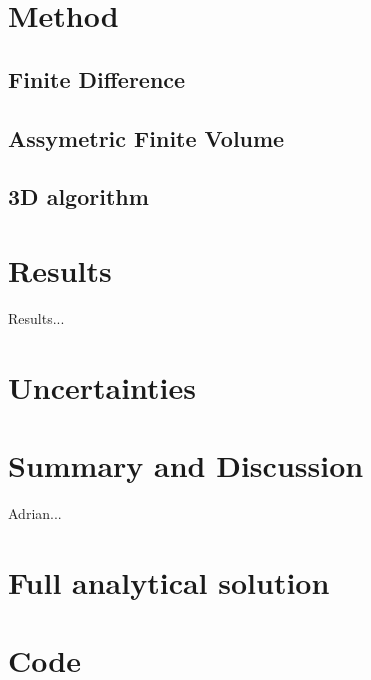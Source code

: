 \documentclass[aps,twocolumn,pre,nofootinbib]{revtex4-1}
\begin{document}
\section{Method \label{sec:met}}

 
\subsection{Finite Difference }


\subsection{Assymetric Finite Volume }


\subsection{3D algorithm}






\section{Results \label{sec:res}}


Results...


\section{Uncertainties \label{sec:unc}}




\section{Summary and Discussion \label{sec:sum}}


\begin{acknowledgments}
Adrian...
\end{acknowledgments}


\appendix*
\section{Full analytical solution}
\section{Code}
\end{document}
